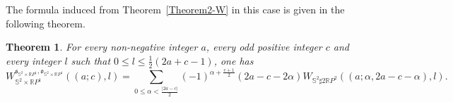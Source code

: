 \documentclass[11pt]{amsart}
\numberwithin{equation}{section}
\theoremstyle{definition}
\theoremstyle{plain}
\newtheorem{theorem}[definition]{Theorem}
\theoremstyle{remark}
\newcommand{\R}{\mathbb{R}}
\begin{document}
The formula induced from Theorem~\ref{Theorem2-W} in this case is given in the following theorem.

\begin{theorem} \label{Theorem-W.in.deg.6.2}
For every non-negative integer $a$, every odd positive integer $c$ and every integer $l$ such that $0\leq l \leq \frac{1}{2}(2a+c-1)$, one has 
\begin{equation}\label{Eq:W.in.deg.6.2}
    W_{\mathbb{S}^2 \times \R P^1}^{\mathfrak{s}_{\mathbb{S}^2 \times \R P^1},\mathfrak{o}_{\mathbb{S}^2 \times \R P^1}}((a;c),l)=\sum_{0\leq\alpha<\frac{|2a-c|}{2}}(-1)^{ \alpha +\frac{c+1}{2}} (2a-c-2\alpha) W_{\mathbb{S}^2\sharp 2 {\R P^2}} ((a;\alpha,2a-c-\alpha),l).
\end{equation}
\end{theorem}
\end{document}
